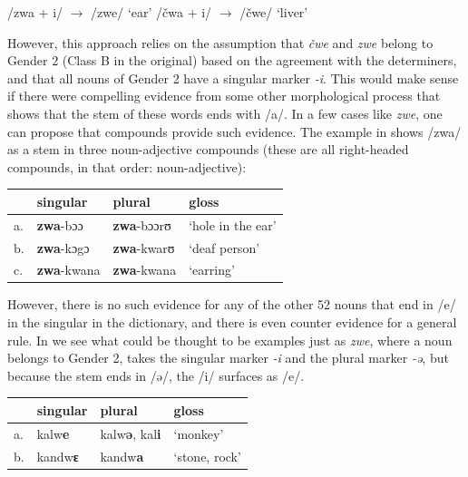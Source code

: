 \begin{exe}
    \ex \label{kasem-wrong-1}
    \begin{xlist}
        \ex /zwa + i/ $\rightarrow$ /zwe/ `ear'
        \ex /čwa + i/ $\rightarrow$ /čwe/ `liver'
    \end{xlist}
\end{exe}

However, this approach relies on the assumption that \textit{čwe} and \textit{zwe} belong to Gender 2 (Class B in the original) based on the agreement with the determiners, and that all nouns of Gender 2 have a singular marker \textit{-i}. This would make sense if there were compelling evidence from some other morphological process that shows that the stem of these words ends with /a/. In a few cases like \textit{zwe}, one can propose that compounds provide such evidence. The example in  shows /zwa/ as a stem in three noun-adjective compounds (these are all right-headed compounds, in that order: noun-adjective):

\begin{exe}
    \ex \label{stem-zwe}
    \begin{tabular}[t]{llll}
      & singular  & plural    & gloss             \\
      \midrule
      a. & \textbf{zwa}-bɔɔ   & \textbf{zwa}-bɔɔrʊ & `hole in the ear' \\
      b. & \textbf{zwa}-kɔgɔ  & \textbf{zwa}-kwarʊ & `deaf person'     \\
      c. & \textbf{zwa}-kwana & \textbf{zwa}-kwana & `earring'         \\
    \end{tabular}
\end{exe}

However, there is no such evidence for any of the other 52 nouns that end in /e/ in the singular in the dictionary, and there is even counter evidence for a general rule. In  we see what could be thought to be examples just as \textit{zwe}, where a noun belongs to Gender 2, takes the singular marker \textit{-i} and the plural marker \textit{-ə}, but because the stem ends in /ə/, the /i/ surfaces as /e/.

\begin{exe}
    \ex \label{stem-E-base}
    \begin{tabular}[t]{llll}
      & singular        & plural                        & gloss         \\
      \midrule
      a. & kalw\textbf{e}  & kalw\textbf{ə}, kal\textbf{i} & `monkey'      \\
      b. & kandw\textbf{ɛ} & kandw\textbf{a}               & `stone, rock' \\
    \end{tabular}
\end{exe}


